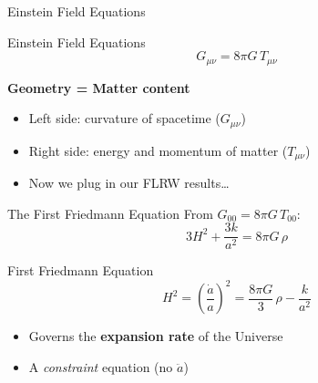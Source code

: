 \documentclass[aspectratio=169,11pt]{beamer}
\begin{document}
\begin{frame}{Einstein Field Equations}
\begin{alertblock}{Einstein Field Equations}
\begin{equation*}
    G_{\mu\nu} = 8\pi G\,T_{\mu\nu}
\end{equation*}
\end{alertblock}
\vspace{0.3cm}
\begin{center}
\large\textbf{Geometry = Matter content}
\end{center}
\vspace{0.3cm}
\begin{itemize}
    \item Left side: curvature of spacetime ($G_{\mu\nu}$)
    \item Right side: energy and momentum of matter ($T_{\mu\nu}$)
    \item Now we plug in our FLRW results\ldots
\end{itemize}
\end{frame}

\begin{frame}{The First Friedmann Equation}
From $G_{00}=8\pi G\,T_{00}$:
\begin{equation*}
    3H^2 + \frac{3k}{a^2} = 8\pi G\,\rho
\end{equation*}

\begin{alertblock}{First Friedmann Equation}
\begin{equation*}
    H^2 = \left(\frac{\dot{a}}{a}\right)^{\!2}
    = \frac{8\pi G}{3}\,\rho - \frac{k}{a^2}
\end{equation*}
\end{alertblock}

\begin{itemize}
    \item Governs the \textbf{expansion rate} of the Universe
    \item A \emph{constraint} equation (no $\ddot{a}$)
\end{itemize}
\end{frame}
\end{document}
